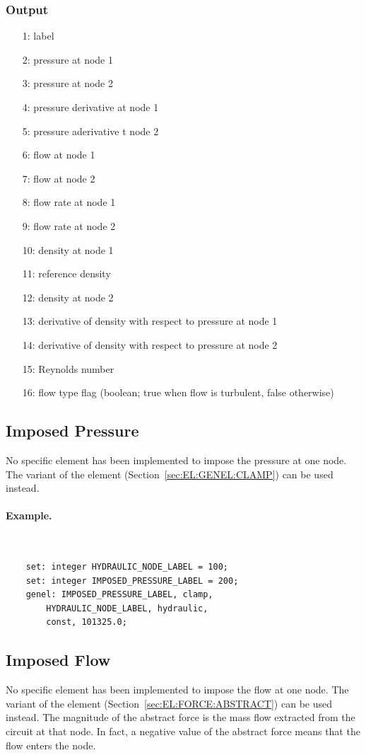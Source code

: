 \subsubsection{Output}
\begin{itemize}
\item[1:] label
\item[2:] pressure at node 1
\item[3:] pressure at node 2
\item[4:] pressure derivative at node 1
\item[5:] pressure aderivative t node 2
\item[6:] flow at node 1
\item[7:] flow at node 2
\item[8:] flow rate at node 1
\item[9:] flow rate at node 2
\item[10:] density at node 1
\item[11:] reference density
\item[12:] density at node 2
\item[13:] derivative of density with respect to pressure at node 1
\item[14:] derivative of density with respect to pressure at node 2
\item[15:] Reynolds number
\item[16:] flow type flag (boolean; true when flow is turbulent, false otherwise)
\end{itemize}



\subsection{Imposed Pressure}
\label{sec:EL:HYDR:IMPOSED_PRESSURE}
No specific element has been implemented to impose the pressure at one node.
The  variant of the  element
(Section~\ref{sec:EL:GENEL:CLAMP}) can be used instead.

\paragraph{Example.} \
\begin{verbatim}
    set: integer HYDRAULIC_NODE_LABEL = 100;
    set: integer IMPOSED_PRESSURE_LABEL = 200;
    genel: IMPOSED_PRESSURE_LABEL, clamp,
        HYDRAULIC_NODE_LABEL, hydraulic,
        const, 101325.0;
\end{verbatim}


\subsection{Imposed Flow}
\label{sec:EL:HYDR:IMPOSED_FLOW}
No specific element has been implemented to impose the flow at one node.
The \kw{abstract} variant of the \kw{force} element
(Section~\ref{sec:EL:FORCE:ABSTRACT}) can be used instead.
The magnitude of the abstract force is the mass flow extracted
from the circuit at that node.
In fact, a negative value of the abstract force means that the flow enters
the node.

